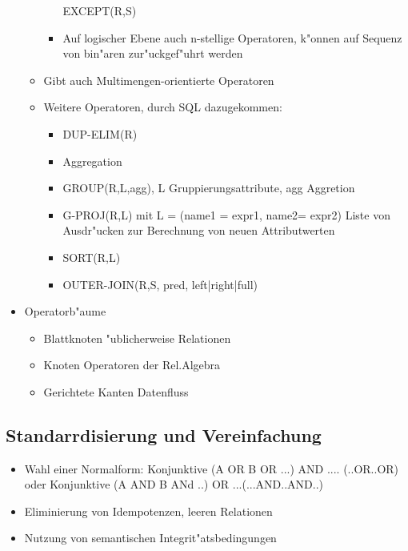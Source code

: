 \documentclass[a4paper, 12pt]{scrartcl}
\begin{document}
\begin{itemize}
\begin{itemize}
\begin{itemize}
						EXCEPT(R,S)
					\item
						Auf logischer Ebene auch n-stellige Operatoren, k"onnen auf Sequenz von bin"aren zur"uckgef"uhrt werden
				\end{itemize}
			\item
				Gibt auch Multimengen-orientierte Operatoren
			\item
				Weitere Operatoren, durch SQL dazugekommen:
				\begin{itemize}
					\item
						DUP-ELIM(R)
					\item
						Aggregation
					\item
						GROUP(R,L,agg), L Gruppierungsattribute, agg Aggretion
					\item
						G-PROJ(R,L) mit L = (name1 = expr1, name2= expr2) Liste von Ausdr"ucken zur Berechnung von neuen Attributwerten
					\item
						SORT(R,L)
					\item
						OUTER-JOIN(R,S, pred, left|right|full)
				\end{itemize}
		\end{itemize}
	\item
		Operatorb"aume
		\begin{itemize}
			\item
				Blattknoten "ublicherweise Relationen
			\item
				Knoten Operatoren der Rel.Algebra
			\item
				Gerichtete Kanten Datenfluss
		\end{itemize}
\end{itemize}


\subsection{Standarrdisierung und Vereinfachung}
\begin{itemize}
	\item
		Wahl einer Normalform: Konjunktive (A OR B OR ...) AND .... (..OR..OR) oder Konjunktive (A AND B ANd ..) OR ...(...AND..AND..)
	\item
		Eliminierung von Idempotenzen, leeren Relationen
	\item
		Nutzung von semantischen Integrit"atsbedingungen
\end{itemize}
\end{document}
